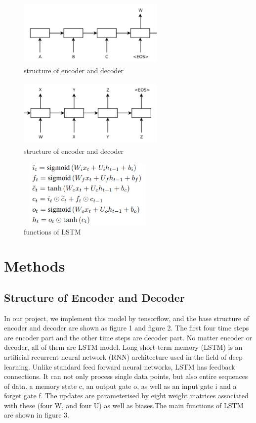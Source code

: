 \documentclass[sigconf]{acmart}
\begin{document}
\begin{figure}
    \centering
    \includegraphics[width = 2.8in, height = 1.3in]{encoder.png}
    \caption{structure of encoder and decoder}
    \label{fig:１}
\end{figure}
\begin{figure}
    \centering
    \includegraphics[width = 2.8in, height = 1.3in]{decoder.png}
    \caption{structure of encoder and decoder}
    \label{fig:２}
\end{figure}
\begin{figure}
    \centering
    \includegraphics[width = 2.7in, height = 1.3in]{LSTM.png}
    \caption{functions of LSTM}
    \label{fig:３}
\end{figure}
\section{Methods}
\subsection{Structure of Encoder and Decoder}
In our project, we implement this model by tensorflow, and the base structure of encoder and decoder are shown as figure 1 and figure 2. The first four time steps are encoder part and the other time steps are decoder part. No matter encoder or decoder, all of them are LSTM model. Long short-term memory (LSTM) is an artificial recurrent neural network (RNN) architecture used in the field of deep learning. Unlike standard feed forward neural networks, LSTM has feedback connections. It can not only process single data points, but also entire sequences of data. a memory state c, an output gate o, as well as an input gate i and a forget gate f. The updates are parameterised by eight weight matrices associated with these (four W, and four U) as well as biases.The main functions of LSTM are shown in figure 3.
\end{document}
